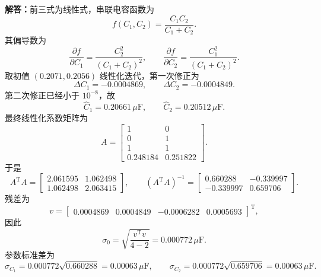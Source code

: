 \documentclass[UTF8,zihao=-4]{ctexart}
\newcommand{\jieda}{\noindent\textbf{解答：}}
\begin{document}
{\jieda 前三式为线性式，串联电容函数为
\begin{equation*}
    f(C_1,C_2)=\frac{C_1C_2}{C_1+C_2}.
\end{equation*}
其偏导数为
\begin{equation*}
    \frac{\partial f}{\partial C_1}=\frac{C_2^2}{(C_1+C_2)^2},
    \qquad
    \frac{\partial f}{\partial C_2}=\frac{C_1^2}{(C_1+C_2)^2}.
\end{equation*}
取初值 $(0.2071,0.2056)$ 线性化迭代，第一次修正为
\begin{equation*}
    \Delta C_1=-0.0004869,
    \qquad
    \Delta C_2=-0.0004849.
\end{equation*}
第二次修正已经小于 $10^{-8}$，故
\begin{equation*}
    \hat{C}_1=0.20661\,\mu\mathrm{F},
    \qquad
    \hat{C}_2=0.20512\,\mu\mathrm{F}.
\end{equation*}
最终线性化系数矩阵为
\begin{equation*}
    A=\begin{bmatrix}
        1&0\\0&1\\1&1\\0.248184&0.251822
    \end{bmatrix}.
\end{equation*}
于是
\begin{equation*}
    A^{\mathrm T}A=\begin{bmatrix}
        2.061595&1.062498\\
        1.062498&2.063415
    \end{bmatrix},
    \qquad
    (A^{\mathrm T}A)^{-1}=\begin{bmatrix}
        0.660288&-0.339997\\
        -0.339997&0.659706
    \end{bmatrix}.
\end{equation*}
残差为
\begin{equation*}
    v=\begin{bmatrix}0.0004869&0.0004849&-0.0006282&0.0005693\end{bmatrix}^{\mathrm T},
\end{equation*}
因此
\begin{equation*}
    \sigma_0=\sqrt{\frac{v^{\mathrm T}v}{4-2}}=0.000772\,\mu\mathrm{F}.
\end{equation*}
参数标准差为
\begin{equation*}
    \sigma_{C_1}=0.000772\sqrt{0.660288}=0.00063\,\mu\mathrm{F},
    \qquad
    \sigma_{C_2}=0.000772\sqrt{0.659706}=0.00063\,\mu\mathrm{F}.
\end{equation*}

}
\end{document}
